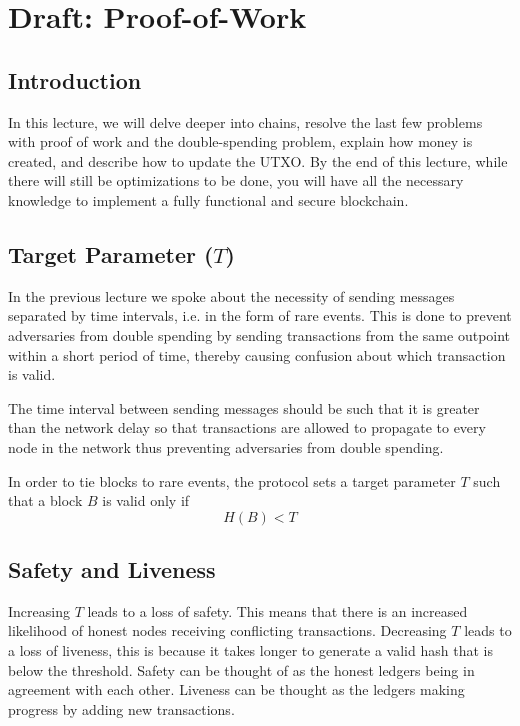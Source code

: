 \chapter{Draft: Proof-of-Work}

\section{Introduction}

In this lecture, we will delve deeper into chains, resolve the last few problems with proof of work and the double-spending problem, explain how money is created, and describe how to update the UTXO. By the end of this lecture, while there will still be optimizations to be done, you will have all the necessary knowledge to implement a fully functional and secure blockchain.

\section{Target Parameter ($T$)}

In the previous lecture we spoke about the necessity of sending messages separated by time intervals, i.e. in the form of rare events. This is done to prevent adversaries from double spending by sending transactions from the same outpoint within a short period of time, thereby causing confusion about which transaction is valid.

The time interval between sending messages should be such that it is greater than the network delay so that transactions are allowed to propagate to every node in the network thus preventing adversaries from double spending.

In order to tie blocks to rare events, the protocol sets a target parameter $T$ such that a block $B$ is valid only if
\begin{equation}
    H(B) < T
\end{equation}

\section{Safety and Liveness}

Increasing $T$ leads to a loss of safety. This means that there is an increased likelihood of honest nodes receiving conflicting transactions.
Decreasing $T$ leads to a loss of liveness, this is because it takes longer to generate a valid hash that is below the threshold.
Safety can be thought of as the honest ledgers being in agreement with each other.
Liveness can be thought as the ledgers making progress by adding new transactions.

